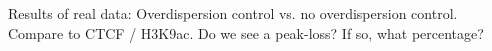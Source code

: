 Results of real data: Overdispersion control vs. no overdispersion control.\\
Compare to CTCF / H3K9ac. Do we see a peak-loss? If so, what percentage?
  